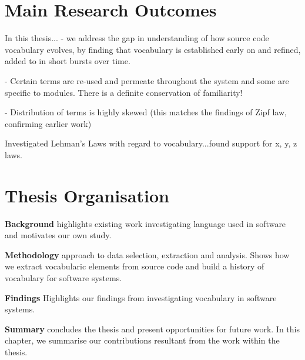 
\section{Main Research Outcomes} %
\label{sec:main_research_outcomes}

In this thesis...
- we address the gap in understanding of how source code vocabulary evolves, by finding that vocabulary is established early on and refined, added to in short bursts over time.

- Certain terms are re-used and permeate throughout the system and some are specific to modules. There is a definite conservation of familiarity!

- Distribution of terms is highly skewed (this matches the findings of Zipf law, confirming earlier work)

Investigated Lehman's Laws with regard to vocabulary...found support for x, y, z laws. 


\section{Thesis Organisation} %
\label{sec:thesis_organisation}

\textbf{Background} highlights existing work investigating language used in software and motivates our own study.

\textbf{Methodology} approach to data selection, extraction and analysis. Shows how we extract vocabularic elements from source code and build a history of vocabulary for software systems.

\textbf{Findings} Highlights our findings from investigating vocabulary in software systems.

\textbf{Summary} concludes the thesis and present opportunities for future work. In this chapter, we summarise our contributions resultant from the work within the thesis.


